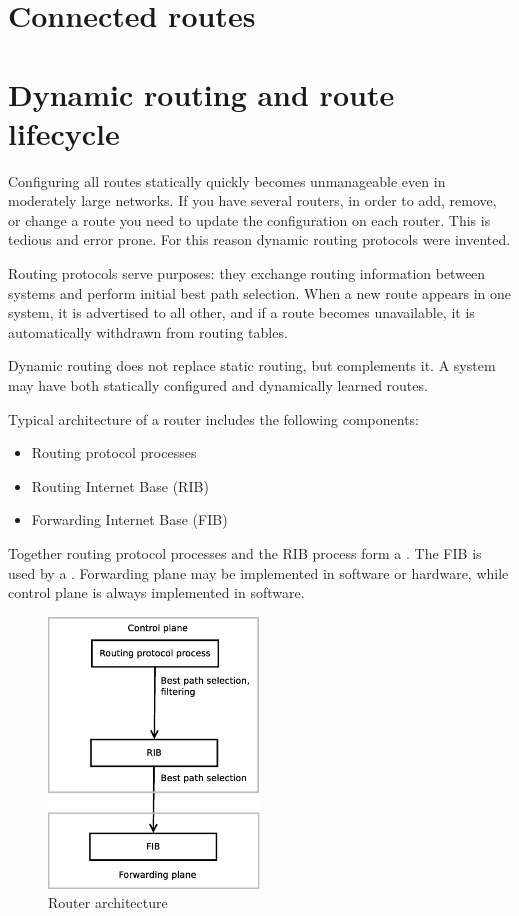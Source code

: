 \section{Connected routes}


\section{Dynamic routing and route lifecycle}

Configuring all routes statically quickly becomes unmanageable even in moderately large networks.
If you have several routers, in order to add, remove, or change a route you need to update the 
configuration on each router. This is tedious and error prone. For this reason dynamic routing
protocols were invented.

Routing protocols serve purposes: they exchange routing information between systems and
perform initial best path selection. When a new route appears in one system, it is advertised
to all other, and if a route becomes unavailable, it is automatically withdrawn from routing tables.

Dynamic routing does not replace static routing, but complements it. A system may have both
statically configured and dynamically learned routes.

Typical architecture of a router includes the following components:

\begin{itemize}
\item Routing protocol processes
\item Routing Internet Base (RIB)
\item Forwarding Internet Base (FIB)
\end{itemize}

Together routing protocol processes and the RIB process form a .
The FIB is used by a . Forwarding plane may be implemented in software
or hardware, while control plane is always implemented in software.

\begin{figure}[h]
    \centering
    \includegraphics[width=0.5\textwidth]{graphics/router_architecture.eps}
    \caption{Router architecture}
    \label{fig:router_architecture}
\end{figure}

